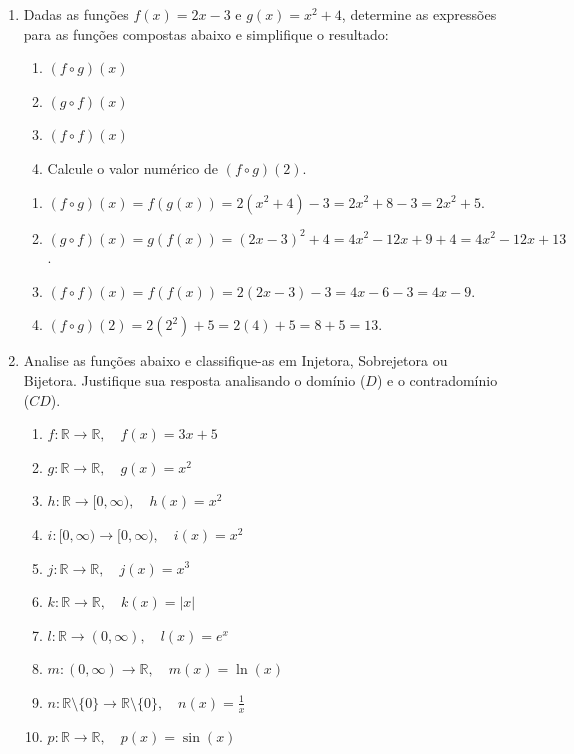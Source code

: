 \documentclass[12pt]{article}
\begin{document}
\begin{enumerate}[label=\arabic*), leftmargin=1.5cm, itemsep=0.5cm]
    \item Dadas as funções $f(x) = 2x - 3$ e $g(x) = x^2 + 4$, determine as expressões para as funções compostas abaixo e simplifique o resultado:
    \begin{enumerate}[label=\alph*)]
        \item $(f \circ g)(x)$
        \item $(g \circ f)(x)$
        \item $(f \circ f)(x)$
        \item Calcule o valor numérico de $(f \circ g)(2)$.
    \end{enumerate}

    \begin{solucao}
        \begin{enumerate}[label=\alph*)]
            \item $(f \circ g)(x) = f(g(x)) = 2(x^2 + 4) - 3 = 2x^2 + 8 - 3 = 2x^2 + 5$.
            \item $(g \circ f)(x) = g(f(x)) = (2x - 3)^2 + 4 = 4x^2 - 12x + 9 + 4 = 4x^2 - 12x + 13$.
            \item $(f \circ f)(x) = f(f(x)) = 2(2x - 3) - 3 = 4x - 6 - 3 = 4x - 9$.
            \item $(f \circ g)(2) = 2(2^2) + 5 = 2(4) + 5 = 8 + 5 = 13$.
        \end{enumerate}
    \end{solucao}

    \item Analise as funções abaixo e classifique-as em Injetora, Sobrejetora ou Bijetora. Justifique sua resposta analisando o domínio ($D$) e o contradomínio ($CD$).
    \begin{enumerate}[label=\alph*)]
        \item $f: \mathbb{R} \to \mathbb{R}, \quad f(x) = 3x + 5$
        \item $g: \mathbb{R} \to \mathbb{R}, \quad g(x) = x^2$
        \item $h: \mathbb{R} \to [0, \infty), \quad h(x) = x^2$
        \item $i: [0, \infty) \to [0, \infty), \quad i(x) = x^2$
        \item $j: \mathbb{R} \to \mathbb{R}, \quad j(x) = x^3$
        \item $k: \mathbb{R} \to \mathbb{R}, \quad k(x) = |x|$
        \item $l: \mathbb{R} \to (0, \infty), \quad l(x) = e^x$
        \item $m: (0, \infty) \to \mathbb{R}, \quad m(x) = \ln(x)$
        \item $n: \mathbb{R} \setminus \{0\} \to \mathbb{R} \setminus \{0\}, \quad n(x) = \frac{1}{x}$
        \item $p: \mathbb{R} \to \mathbb{R}, \quad p(x) = \sin(x)$
    \end{enumerate}


\end{enumerate}
\end{document}

